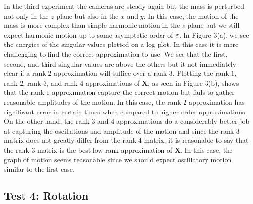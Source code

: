 \documentclass[12pt]{article}%
\begin{document}
In the third experiment the cameras are steady again but the mass is perturbed not only in the $z$ plane but also in the $x$ and $y$. In this case, the motion of the mass is more complex than simple harmonic motion in the $z$ plane but we still expect harmonic motion up to some asymptotic order of ${\varepsilon}$. In Figure 3(a), we see the energies of the singular values plotted on a log plot. In this case it is more challenging to find the correct approximation to use. We see that the first, second, and third singular values are above the others but it not immediately clear if a rank-$2$ approximation will suffice over a rank-$3$. Plotting the rank-$1$, rank-$2$, rank-$3$, and rank-$4$ approximations of $\mathbf{X}$, as seen in Figure 3(b), shows that the rank-$1$ approximation capture the correct motion but fails to gather reasonable amplitudes of the motion. In this case, the rank-$2$ approximation has significant error in certain times when compared to higher order approximations. On the other hand, the rank-$3$ and $4$ approximations do a considerably better job at capturing the oscillations and amplitude of the motion and since the rank-$3$ matrix does not greatly differ from the rank-$4$ matrix, it is reasonable to say that the rank-$3$ matrix is the best low-rank approximation of $\mathbf{X}$. In this case, the graph of motion seems reasonable since we should expect oscillatory motion similar to the first case. 


\subsection{Test 4: Rotation}
\end{document}
